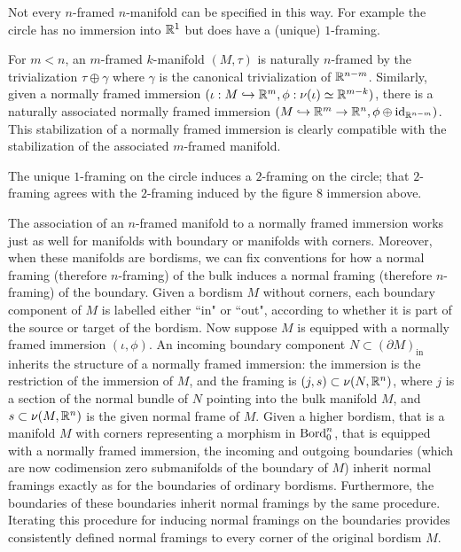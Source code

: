 \documentclass{amsart}
\begin{document}
\begin{warning}  
Not every $n$-framed $n$-manifold can be specified in this way. For example the circle has no immersion into $\mathbb R^1$ but does have a (unique) $1$-framing.
\end{warning}

For $m < n$, an $m$-framed $k$-manifold $(M,\tau)$ is naturally $n$-framed by the trivialization $\tau \oplus \gamma$ where $\gamma$ is the canonical trivialization of $\mathbb R^{n-m}$.  Similarly, given a normally framed immersion $(\iota: M \hookrightarrow \mathbb R^m, \phi: \nu(\iota) \simeq \mathbb R^{m-k})$, there is a naturally associated normally framed immersion $(M \hookrightarrow \mathbb R^m \rightarrow \mathbb R^n, \phi \oplus \mathrm{id}_{\mathbb R^{n-m}})$.  This stabilization of a normally framed immersion is clearly compatible with the stabilization of the associated $m$-framed manifold.

\begin{example}
The unique $1$-framing on the circle induces a $2$-framing on the circle; that $2$-framing agrees with the $2$-framing induced by the figure 8 immersion above. 
\end{example}

The association of an $n$-framed manifold to a normally framed immersion works just as well for manifolds with boundary or manifolds with corners.  Moreover, when these manifolds are bordisms, we can fix conventions for how a normal framing (therefore $n$-framing) of the bulk induces a normal framing (therefore $n$-framing) of the boundary.  Given a bordism $M$ without corners, each boundary component of $M$ is labelled either ``in" or ``out", according to whether it is part of the source or target of the bordism.  Now suppose $M$ is equipped with a normally framed immersion $(\iota,\phi)$.  An incoming boundary component $N \subset (\partial M)_{\textrm{in}}$ inherits the structure of a normally framed immersion: the immersion is the restriction of the immersion of $M$, and the framing is $(j, s) \subset \nu(N,\mathbb R^n)$, where $j$ is a section of the normal bundle of $N$ pointing into the bulk manifold $M$, and $s \subset \nu(M,\mathbb R^n)$ is the given normal frame of $M$.  Given a higher bordism, that is a manifold $M$ with corners representing a morphism in $\mathrm{Bord}_0^n$, that is equipped with a normally framed immersion, the incoming and outgoing boundaries (which are now codimension zero submanifolds of the boundary of $M$) inherit normal framings exactly as for the boundaries of ordinary bordisms.  Furthermore, the boundaries of these boundaries inherit normal framings by the same procedure.  Iterating this procedure for inducing normal framings on the boundaries provides consistently defined normal framings to every corner of the original bordism $M$.
\end{document}
